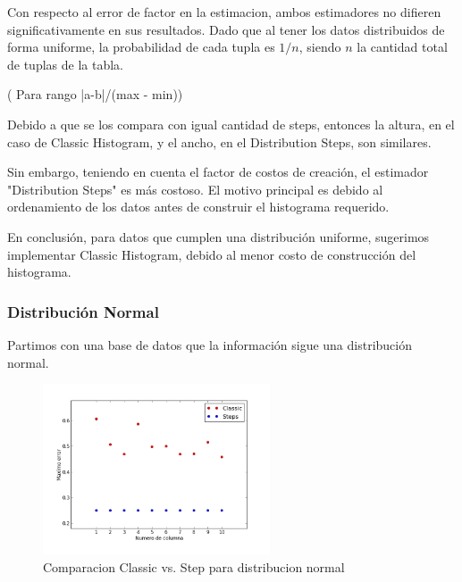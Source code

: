\documentclass[10pt, a4paper,english,spanish,hidelinks]{article}
\begin{document}
Con respecto al error de factor en la estimacion, ambos estimadores no difieren significativamente en sus resultados. Dado que
al tener los datos distribuidos de forma uniforme, la probabilidad de cada tupla es $1/n$, siendo $n$ la cantidad total de tuplas de la tabla.

( Para rango |a-b|/(max - min))


Debido a que se los compara con igual cantidad de steps, entonces la altura, en el caso de Classic Histogram, y el ancho, en el Distribution Steps, son similares.

Sin embargo, teniendo en cuenta el factor de costos de creación, el estimador "Distribution Steps" es más costoso. El motivo principal es debido al ordenamiento de los datos antes de construir el histograma requerido.

En conclusión, para datos que cumplen una distribución uniforme, sugerimos implementar Classic Histogram, debido al menor costo de construcción del histograma.


\subsubsection{Distribución Normal}

Partimos con una base de datos que la información sigue una distribución normal.

\begin{figure}[h!]
  \centering
  \includegraphics[width=0.6\textwidth]{./imagenes/ejb1_normal.png}
  \caption{Comparacion Classic vs. Step para distribucion normal}
\end{figure}
\end{document}
